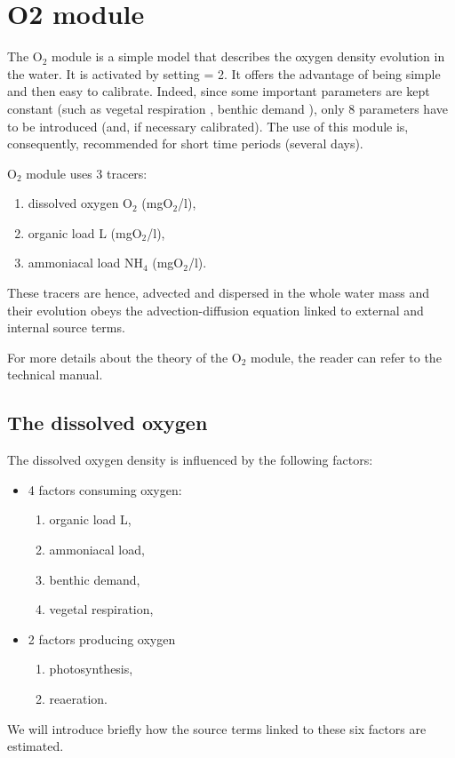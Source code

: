 \chapter{O2 module}
\label{subs:O2:mod}

The O$_2$ module is a simple model that describes the oxygen density evolution in the water.
It is activated by setting  = 2.
It offers the advantage of being simple and then easy to calibrate.
Indeed, since some important parameters are kept constant
(such as vegetal respiration ,
benthic demand ),
only 8 parameters have to be introduced (and, if necessary calibrated).
The use of this module is, consequently, recommended for short time periods (several days).

O$_2$ module uses 3 tracers:

\begin{enumerate}
\item dissolved oxygen O$_2$ (mgO$_2$/l),
\item organic load L (mgO$_2$/l),
\item ammoniacal load NH$_4$ (mgO$_2$/l).
\end{enumerate}

These tracers are hence, advected and dispersed in the whole water mass
and their evolution obeys the advection-diffusion equation linked to external and internal source terms.

For more details about the theory of the O$_2$ module,
the reader can refer to the \waqtel technical manual.


\section{The dissolved oxygen}

The dissolved oxygen density is influenced by the following factors:

\begin{itemize}
\item 4 factors consuming oxygen:

\begin{enumerate}
\item organic load L,
\item ammoniacal load,
\item benthic demand,
\item vegetal respiration,
\end{enumerate}

\item 2 factors producing oxygen
\begin{enumerate}
\item photosynthesis,

\item reaeration.
\end{enumerate}
\end{itemize}
We will introduce briefly how the source terms linked to these six factors are estimated.


